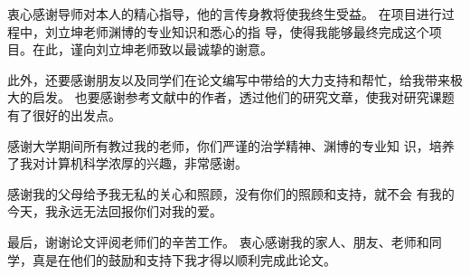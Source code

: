 \begin{acknowledgements}
衷心感谢导师对本人的精心指导，他的言传身教将使我终生受益。
在项目进行过程中，刘立坤老师渊博的专业知识和悉心的指
导，使得我能够最终完成这个项目。在此，谨向刘立坤老师致以最诚挚的谢意。

此外，还要感谢朋友以及同学们在论文编写中带给的大力支持和帮忙，给我带来极大的启发。
也要感谢参考文献中的作者，透过他们的研究文章，使我对研究课题有了很好的出发点。

感谢大学期间所有教过我的老师，你们严谨的治学精神、渊博的专业知
识，培养了我对计算机科学浓厚的兴趣，非常感谢。

感谢我的父母给予我无私的关心和照顾，没有你们的照顾和支持，就不会
有我的今天，我永远无法回报你们对我的爱。

最后，谢谢论文评阅老师们的辛苦工作。
衷心感谢我的家人、朋友、老师和同学，真是在他们的鼓励和支持下我才得以顺利完成此论文。
\end{acknowledgements}
